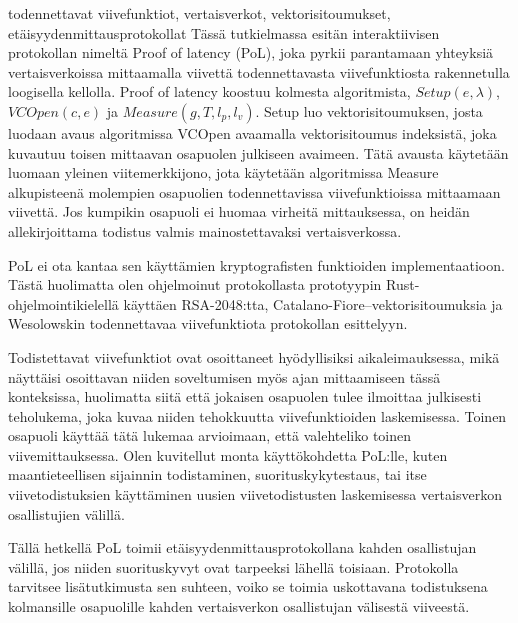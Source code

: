 \begin{ittiivis}{todennettavat viivefunktiot, vertaisverkot, vektorisitoumukset, et\"aisyydenmittausprotokollat}
	T\"ass\"a tutkielmassa esit\"an interaktiivisen protokollan nimeltä Proof of latency (PoL), joka pyrkii parantamaan yhteyksi\"a vertaisverkoissa mittaamalla viivett\"a todennettavasta viivefunktiosta rakennetulla loogisella kellolla. Proof of latency koostuu kolmesta algoritmista, \(Setup(e, \lambda)\), \(VCOpen(c, e)\) ja \(Measure(g, T, l_p, l_v)\). Setup luo vektorisitoumuksen, josta luodaan avaus algoritmissa VCOpen avaamalla vektorisitoumus indeksist\"a, joka kuvautuu toisen mittaavan osapuolen julkiseen avaimeen. T\"at\"a avausta k\"aytet\"a\"an luomaan yleinen viitemerkkijono, jota k\"aytet\"a\"an algoritmissa Measure alkupisteen\"a molempien osapuolien todennettavissa viivefunktioissa mittaamaan viivett\"a. Jos kumpikin osapuoli ei huomaa virheit\"a mittauksessa, on heid\"an allekirjoittama todistus valmis mainostettavaksi vertaisverkossa.

PoL ei ota kantaa sen k\"aytt\"amien kryptografisten funktioiden implementaatioon. T\"ast\"a huolimatta olen ohjelmoinut protokollasta prototyypin Rust-ohjelmointikielell\"a k\"aytt\"aen RSA-2048:tta, Catalano-Fiore--vektorisitoumuksia ja Wesolowskin todennettavaa viivefunktiota protokollan esittelyyn. 

Todistettavat viivefunktiot ovat osoittaneet hy\"odyllisiksi aikaleimauksessa, mik\"a n\"aytt\"aisi osoittavan niiden soveltumisen my\"os ajan mittaamiseen t\"ass\"a konteksissa, huolimatta siit\"a ett\"a jokaisen osapuolen tulee ilmoittaa julkisesti teholukema, joka kuvaa niiden tehokkuutta viivefunktioiden laskemisessa. Toinen osapuoli k\"aytt\"a\"a t\"at\"a lukemaa arvioimaan, että valehteliko toinen viivemittauksessa. Olen kuvitellut monta k\"aytt\"okohdetta PoL:lle, kuten maantieteellisen sijainnin todistaminen, suorituskykytestaus, tai itse viivetodistuksien k\"aytt\"aminen uusien viivetodistusten laskemisessa vertaisverkon osallistujien v\"alill\"a.

T\"all\"a hetkell\"a PoL toimii et\"aisyydenmittausprotokollana kahden osallistujan v\"alill\"a, jos niiden suorituskyvyt ovat tarpeeksi l\"ahell\"a toisiaan. Protokolla tarvitsee lis\"atutkimusta sen suhteen, voiko se toimia uskottavana todistuksena kolmansille osapuolille kahden vertaisverkon osallistujan v\"alisest\"a viiveest\"a.
\end{ittiivis}
